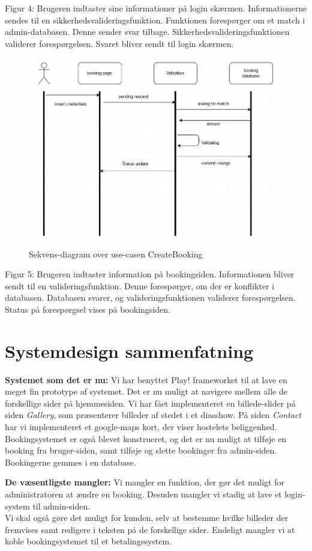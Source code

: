 \documentclass[12pt,a4paper]{article}
\begin{document}
Figur 4:
Brugeren indtaster sine informationer på login skærmen.
Informationerne sendes til en sikkerhedsvalideringsfunktion.
Funktionen forespørger om et match i admin-databasen.
Denne sender svar tilbage.
Sikkerhedsvalideringsfunktionen validerer forespørgelsen.
Svaret bliver sendt til login skærmen.
\begin{figure}[H]
\centering
\includegraphics[scale=0.6]{customerLog-in.jpg}
\caption{Sekvens-diagram over use-casen CreateBooking}
\end{figure}
Figur 5:
Brugeren indtaster information på bookingsiden.
Informationen bliver sendt til en valideringsfunktion.
Denne forespørger, om der er konflikter i databasen.
Databasen svarer, og
valideringsfunktionen validerer forespørgelsen.
Status på forespørgsel vises på bookingsiden.
\newpage
\section{Systemdesign sammenfatning}
\textbf{Systemet som det er nu:}
Vi har benyttet Play! frameworket til at lave en meget fin prototype af systemet.
Det er nu muligt at navigere mellem alle de forskellige sider på hjemmesiden. Vi har fået implementeret en billede-slider på siden \textit{Gallery}, som præsenterer billeder af stedet i et diasshow. På siden \textit{Contact} har vi implementeret et google-maps kort, der viser hostelets beliggenhed. Bookingsystemet er også blevet konstrueret, og det er nu muligt at tilføje en booking fra bruger-siden, samt tilføje og slette bookinger fra admin-siden. Bookingerne gemmes i en database.    

\textbf{De væsentligste mangler:}
Vi mangler en funktion, der gør det muligt for administratoren at ændre en booking. Desuden mangler vi stadig at lave et login-system til admin-siden.\\
Vi skal også gøre det muligt for kunden, selv at bestemme hvilke billeder der fremvises samt redigere i teksten på de forskellige sider. Endeligt mangler vi at koble bookingsystemet til et betalingssystem.
\end{document}

